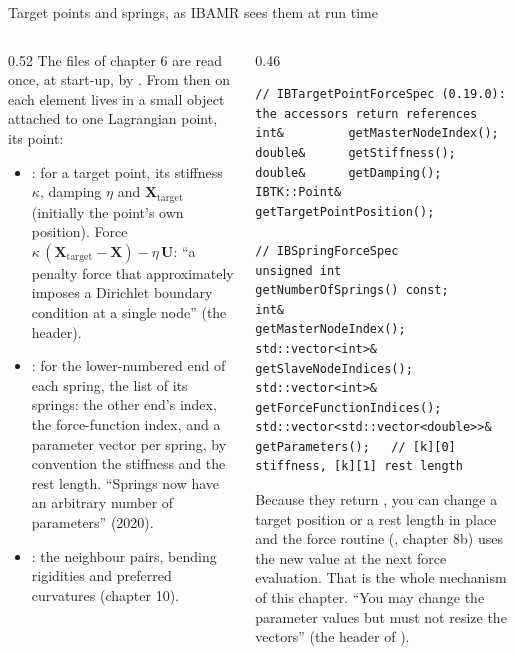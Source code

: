 \documentclass[aspectratio=169,11pt]{beamer}
\begin{document}
\begin{frame}[fragile]{Target points and springs, as IBAMR sees them at run time}
\label{fr:specs}
\begin{columns}[T,onlytextwidth]
\begin{column}{0.52\textwidth}
\footnotesize The files of chapter 6 are read once, at start-up, by . From then on each element lives in a small object attached to one Lagrangian point, its  point:
\begin{itemize}
  \item {}: for a target point, its stiffness $\kappa$, damping $\eta$ and  $\mathbf{X}_{\mathrm{target}}$ (initially the point's own position). Force $\kappa\,(\mathbf{X}_{\mathrm{target}} - \mathbf{X}) - \eta\,\mathbf{U}$: ``a penalty force that approximately imposes a Dirichlet boundary condition at a single node'' (the header).
  \item {}: for the lower-numbered end of each spring, the list of its springs: the other end's index, the force-function index, and a parameter vector per spring, by convention \code{[0]} the stiffness and \code{[1]} the rest length. ``Springs now have an arbitrary number of parameters'' (2020).
  \item {}: the neighbour pairs, bending rigidities and preferred curvatures (chapter 10).
\end{itemize}
\end{column}
\begin{column}{0.46\textwidth}
\begin{lstlisting}[style=cpptiny]
// IBTargetPointForceSpec (0.19.0): the accessors return references
int&         getMasterNodeIndex();
double&      getStiffness();
double&      getDamping();
IBTK::Point& getTargetPointPosition();

// IBSpringForceSpec
unsigned int                      getNumberOfSprings() const;
int&                              getMasterNodeIndex();
std::vector<int>&                 getSlaveNodeIndices();
std::vector<int>&                 getForceFunctionIndices();
std::vector<std::vector<double>>& getParameters();   // [k][0] stiffness, [k][1] rest length
\end{lstlisting}
\footnotesize Because they return , you can change a target position or a rest length in place and the force routine (, chapter 8b) uses the new value at the next force evaluation. That is the whole mechanism of this chapter. ``You may change the parameter values but must not resize the vectors'' (the header of ).
\end{column}
\end{columns}
\end{frame}
\end{document}
